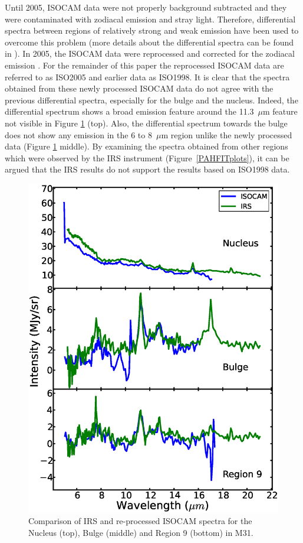 Until 2005, ISOCAM data were not properly background subtracted and they were contaminated with zodiacal emission and stray light. 
Therefore, differential spectra between regions of relatively strong and weak emission have been used to overcome this problem 
(more details about the differential spectra can be found in \citealt{1998Cesarsky}). In 2005, the ISOCAM data were reprocessed 
and corrected for the zodiacal emission \citep{Boulanger_F_2005}. For the remainder of this paper the reprocessed ISOCAM data are 
referred to as ISO2005 and earlier data as ISO1998. It is clear that the spectra obtained from these newly processed ISOCAM data 
do not agree with the previous differential spectra, especially for the bulge and the nucleus. Indeed, the differential spectrum shows a broad emission feature
around the 11.3~$\mu$m feature not visible in Figure \ref{ISOnIRS} (top). Also, the differential spectrum towards the bulge does not show 
any emission in the 6 to 8~$\mu$m region unlike the newly processed data (Figure \ref{ISOnIRS} middle).
By examining the spectra obtained from other regions  which were observed by the IRS instrument (Figure~\ref{PAHFITplots}), it can be argued that the IRS results do not support the results based on ISO1998 data.


\begin{figure}
\centering
\includegraphics[scale=0.35]{./ISOvsIRS.eps}
\caption{ Comparison of  IRS and re-processed ISOCAM spectra for the Nucleus (top), Bulge (middle) and Region 9 (bottom) in M31.}
\label{ISOnIRS}
\end{figure}


